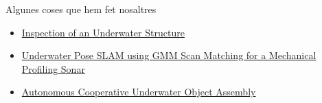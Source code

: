 \begin{frame}{Algunes coses que hem fet nosaltres}

  \begin{itemize}
    \item \href{https://www.youtube.com/watch?v=yE8uoI9v33Q}{Inspection of an Underwater Structure}
    \item \href{https://www.youtube.com/watch?v=4nYtELVcGMA}{Underwater Pose SLAM using GMM Scan Matching for a Mechanical Profiling Sonar}
    \item \href{https://www.youtube.com/watch?v=RfvtNYkLQvM}{Autonomous Cooperative Underwater Object Assembly}
  \end{itemize}

\end{frame}
